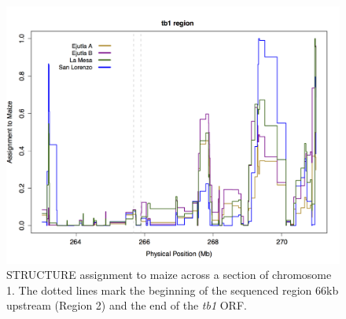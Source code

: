 \documentclass[11pt]{article} %
\begin{document}
\begin{linenumbers}
\begin{flushleft}
\begin{figure}[!t]
  \begin{center}
   \includegraphics[width=160mm]{Fig4Structure.png}
     \end{center}
    \caption{STRUCTURE assignment to maize across a section of chromosome 1. The dotted lines mark the beginning of the sequenced region 66kb upstream (Region 2) and the end of the \emph{tb1} ORF.}
\label{Fig4Structure}
\end{figure}
\clearpage


\end{flushleft}
\end{linenumbers}
\end{document}
